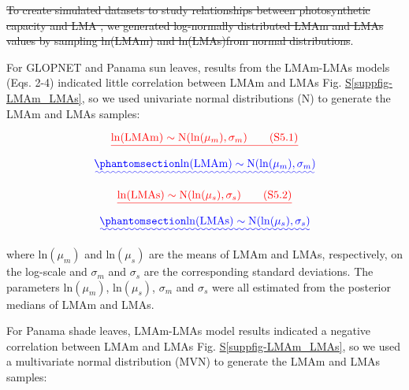 \documentclass[
  12pt,
  letterpaper,
  DIV=11,
  numbers=noendperiod]{scrartcl}
\numberwithin{equation}{section} %
\newcommand*\quartosuppfigref[1]{Fig. \hyperref[#1]{S\ref{#1}}}
\providecommand{\DIFadd}[1]{{\protect\color{blue}\uwave{#1}}} %
\providecommand{\DIFdel}[1]{{\protect\color{red}\sout{#1}}}                      %
\providecommand{\DIFaddbegin}{} %
\providecommand{\DIFaddend}{} %
\providecommand{\DIFdelbegin}{} %
\providecommand{\DIFdelend}{} %
\newcommand{\DIFscaledelfig}{0.5}
\newlength{\DIFdelgraphicswidth} %
\newlength{\DIFdelgraphicsheight} %
\newcommand{\DIFaddincludegraphics}[2][]{{\color{blue}\fbox{\DIFOincludegraphics[#1]{#2}}}} %
\newcommand{\DIFdelincludegraphics}[2][]{%
\sbox{\DIFdelgraphicsbox}{\DIFOincludegraphics[#1]{#2}}%
\settoboxwidth{\DIFdelgraphicswidth}{\DIFdelgraphicsbox} %
\settoboxtotalheight{\DIFdelgraphicsheight}{\DIFdelgraphicsbox} %
\scalebox{\DIFscaledelfig}{%
\parbox[b]{\DIFdelgraphicswidth}{\usebox{\DIFdelgraphicsbox}\\[-\baselineskip] \rule{\DIFdelgraphicswidth}{0em}}\llap{\resizebox{\DIFdelgraphicswidth}{\DIFdelgraphicsheight}{%
\setlength{\unitlength}{\DIFdelgraphicswidth}%
\begin{picture}(1,1)%
\thicklines\linethickness{2pt} %
{\color[rgb]{1,0,0}\put(0,0){\framebox(1,1){}}}%
{\color[rgb]{1,0,0}\put(0,0){\line( 1,1){1}}}%
{\color[rgb]{1,0,0}\put(0,1){\line(1,-1){1}}}%
\end{picture}%
}\hspace*{3pt}}} %
} %
\DeclareRobustCommand{\DIFaddbegin}{\DIFOaddbegin \let\includegraphics\DIFaddincludegraphics} %
\DeclareRobustCommand{\DIFaddend}{\DIFOaddend \let\includegraphics\DIFOincludegraphics} %
\DeclareRobustCommand{\DIFdelbegin}{\DIFOdelbegin \let\includegraphics\DIFdelincludegraphics} %
\DeclareRobustCommand{\DIFdelend}{\DIFOaddend \let\includegraphics\DIFOincludegraphics} %
\begin{document}
\DIFdel{To create simulated datasets to study relationships between
photosynthetic capacity and LMA , we generated log-normally distributed
LMAm and LMAs values by sampling ln(LMAm) and ln(LMAs)from normal
distributions}\DIFdelend \DIFaddbegin \DIFadd{\mbox{%
\citeproc{ref-Osnas2018}{Osnas JLD et al. 2018}}\hspace{0pt}%
)}\DIFaddend .

For GLOPNET and Panama sun leaves, results from the LMAm-LMAs models
(Eqs. 2-4) indicated little correlation between LMAm and LMAs
\DIFaddbegin \DIFadd{(}\quartosuppfigref{suppfig-LMAm_LMAs}\DIFadd{a)}\DIFaddend , so we used univariate normal
distributions (N) to generate the LMAm and LMAs samples:

\DIFdelbegin \[
\DIFdel{\mathrm{ln}(\mathrm{LMAm}) \sim \mathrm{N}(\mathrm{ln}(\mu_m), \sigma_m) \qquad(\mathrm{S}5.1)
}\]%
\DIFdelend \DIFaddbegin \begin{equation}\DIFadd{\phantomsection\label{eq-sim_LMAm}{
\mathrm{ln}(\mathrm{LMAm}) \sim \mathrm{N}(\mathrm{ln}(\mu_m), \sigma_m)
}}\end{equation}\DIFaddend 

\DIFdelbegin \[
\DIFdel{\mathrm{ln}(\mathrm{LMAs}) \sim \mathrm{N}(\mathrm{ln}(\mu_s), \sigma_s) \qquad(\mathrm{S}5.2)
}\]%
\DIFdelend \DIFaddbegin \begin{equation}\DIFadd{\phantomsection\label{eq-sim_LMAs}{
\mathrm{ln}(\mathrm{LMAs}) \sim \mathrm{N}(\mathrm{ln}(\mu_s), \sigma_s)
}}\end{equation}\DIFaddend 

where \(\mathrm{ln}(\mu_m)\) and \(\mathrm{ln}(\mu_s)\) are the means of
LMAm and LMAs, respectively, on the log-scale and \(\sigma_m\) and
\(\sigma_s\) are the corresponding standard deviations. The parameters
\(\mathrm{ln}(\mu_m)\), \(\mathrm{ln}(\mu_s)\), \(\sigma_m\) and
\(\sigma_s\) were all estimated from the posterior medians of LMAm and
LMAs.

For Panama shade leaves, LMAm-LMAs model results indicated a negative
correlation between LMAm and LMAs
\DIFaddbegin \DIFadd{(}\quartosuppfigref{suppfig-LMAm_LMAs}\DIFadd{b)}\DIFaddend , so we used a multivariate
normal distribution (MVN) to generate the LMAm and LMAs samples:
\end{document}
